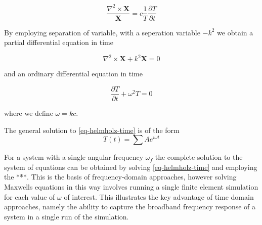$$
\frac{\nabla^2 \times \mathbf{X}}{\mathbf{X}} = c \frac{1}{T} \frac{\partial T}{\partial t }
$$

By employing separation of variable, with a seperation variable $-k^2$ we obtain a partial differential equation in time

\begin{equation}
\nabla^2 \times \mathbf{X} + k^2 \mathbf{X} = 0
\label{eq-helmholz-time}
\end{equation}

and an ordinary differential equation in time

\begin{equation}
\frac{\partial T}{\partial t} + \omega ^2 T  = 0
\label{eq-helmholz-time}
\end{equation}

where we define $\omega = k c$.

The general solution to \eqref{eq-helmholz-time} is of the form
$$
T(t) = \sum A e^{i \omega t}
$$

For a system with a single angular frequency $\omega_f$ the complete solution to the system of equations can be obtained by solving \eqref{eq-helmholz-time} and employing the ***. This is the basis of frequency-domain approaches, however solving Maxwells equations in this way involves running a single finite element simulation for each value of $\omega$ of interest. This illustrates the key advantage of time domain approaches, namely the ability to capture the broadband frequency response of a system in a single run of the simulation.



